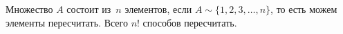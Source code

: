 
Множество $A$ состоит из~$n$ элементов, если $A\sim\{1,2,3,\ldots,n\}$, то есть можем элементы пересчитать. Всего $n!$ способов пересчитать.
